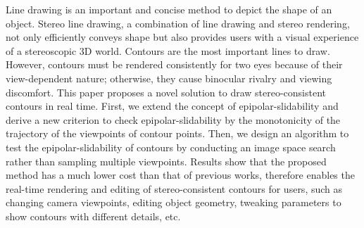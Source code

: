 \begin{englishabstract}
Line drawing is an important and concise method to depict the shape of an object. Stereo line drawing, a combination of line drawing and stereo rendering, not only efficiently conveys shape but also provides users with a visual experience of a stereoscopic 3D world. Contours are the most important lines to draw. However, contours must be rendered consistently for two eyes because of their view-dependent nature; otherwise, they cause binocular rivalry and viewing discomfort. This paper proposes a novel solution to draw stereo-consistent contours in real time. First, we extend the concept of epipolar-slidability and derive a new criterion to check epipolar-slidability by the monotonicity of the trajectory of the viewpoints of contour points. Then, we design an algorithm to test the epipolar-slidability of contours by conducting an image space search rather than sampling multiple viewpoints. Results show that the proposed method has a much lower cost than that of previous works, therefore enables the real-time rendering and editing of stereo-consistent contours for users, such as changing camera viewpoints, editing object geometry, tweaking parameters to show contours with different details, etc.

\end{englishabstract}
